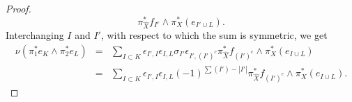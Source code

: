 \documentclass[12pt]{amsart}
\numberwithin{equation}{subsection}
\theoremstyle{plain}
\theoremstyle{definition}
\begin{document}
\begin{proof}
\[%
\pi_{\hat{X}}^*f_{I^c}
\wedge\pi_{X}^*(e_{I'\cup L}).
\]
Interchanging $I$ and $I'$, with respect to which the sum is symmetric, we get
\begin{eqnarray}
\label{eq-phi-of-e-K-e-L}
\nu(\pi_1^*e_K\wedge \pi_2^*e_L)&=&
\sum_{I\subset K}\epsilon_{I',I}\epsilon_{I,L}\sigma_{I'}
\epsilon_{I',(I')^c}
\pi_{\hat{X}}^*f_{(I')^c}
\wedge\pi_X^*(e_{I\cup L})
\\
\nonumber
&=& \sum_{I\subset K}\epsilon_{I',I}\epsilon_{I,L}
(-1)^{\sum(I')-|I'|}
\pi_{\hat{X}}^*f_{(I')^c}
\wedge\pi_X^*(e_{I\cup L}).
\end{eqnarray}




\end{proof}
\end{document}
